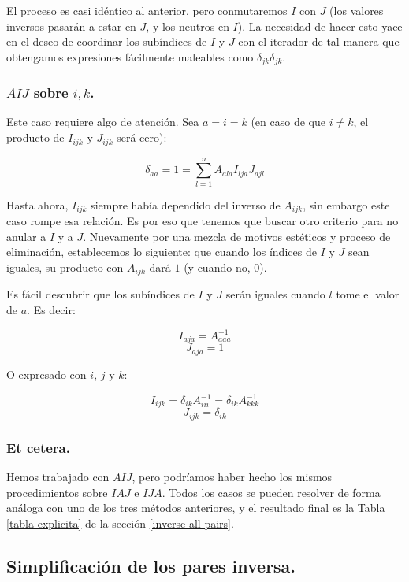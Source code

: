 El proceso es casi idéntico al anterior, pero conmutaremos $I$ con $J$ (los valores inversos pasarán a estar en $J$, y los neutros en $I$). La necesidad de hacer esto yace en el deseo de coordinar los subíndices de $I$ y $J$ con el iterador de tal manera que obtengamos expresiones fácilmente maleables como $\delta_{jk} \delta_{jk}$.

\newpage

\subsubsection{$AIJ$ sobre $i, k$.}

Este caso requiere algo de atención. Sea $a = i = k$ (en caso de que $i \neq k$, el producto de $I_{ijk}$ y $J_{ijk}$ será cero):

$$\delta_{aa} = 1 = \sum\limits_{l = 1}^{n} A_{ala} I_{lja} J_{ajl}$$

Hasta ahora, $I_{ijk}$ siempre había dependido del inverso de $A_{ijk}$, sin embargo este caso rompe esa relación. Es por eso que tenemos que buscar otro criterio para no anular a $I$ y a $J$. Nuevamente por una mezcla de motivos estéticos y proceso de eliminación, establecemos lo siguiente: que cuando los índices de $I$ y $J$ sean iguales, su producto con $A_{ijk}$ dará $1$ (y cuando no, $0$).

Es fácil descubrir que los subíndices de $I$ y $J$ serán iguales cuando $l$ tome el valor de $a$. Es decir:

$$I_{aja} = A_{aaa}^{-1}$$
$$J_{aja} = 1$$

O expresado con $i$, $j$ y $k$:

$$I_{ijk} = \delta_{ik} A_{iii}^{-1} = \delta_{ik} A_{kkk}^{-1}$$
$$J_{ijk} = \delta_{ik}$$

\subsubsection{Et cetera.}

Hemos trabajado con $AIJ$, pero podríamos haber hecho los mismos procedimientos sobre $IAJ$ e $IJA$. Todos los casos se pueden resolver de forma análoga con uno de los tres métodos anteriores, y el resultado final es la Tabla \ref{tabla-explicita} de la sección \ref{inverse-all-pairs}.

\subsection{Simplificación de los pares inversa.} \label{appendix-4}

